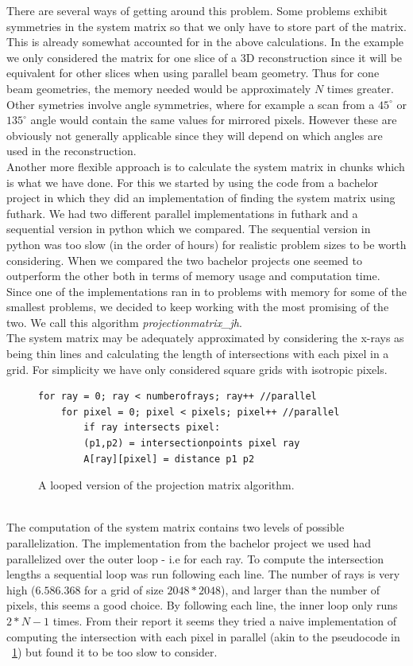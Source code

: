 There are several ways of getting around this problem. Some problems exhibit symmetries in the system matrix so that we only have to store part of the matrix. This is already somewhat accounted for in the above calculations. In the example we only considered the matrix for one slice of a 3D reconstruction since it will be equivalent for other slices when using parallel beam geometry. Thus for cone beam geometries, the memory needed would be approximately $N$ times greater. Other symetries involve angle symmetries, where for example a scan from a $45^{\circ}$ or $135^{\circ}$ angle would contain the same values for mirrored pixels. However these are obviously not generally applicable since they will depend on which angles are used in the reconstruction.\\
Another more flexible approach is to calculate the system matrix in chunks which is what we have done. For this we started by using the code from a bachelor project in which they did an implementation of finding the system matrix using futhark. We had two different parallel implementations in futhark and a sequential version in python which we compared. The sequential version in python was too slow (in the order of hours) for realistic problem sizes to be worth considering. When we compared the two bachelor projects one seemed to outperform the other both in terms of memory usage and computation time. Since one of the implementations ran in to problems with memory for some of the smallest problems, we decided to keep working with the most promising of the two. We call this algorithm \emph{projectionmatrix\_jh}.\\
The system matrix may be adequately approximated by considering the x-rays as being thin lines and calculating the length of intersections with each pixel in a grid. For simplicity we have only considered square grids with isotropic pixels.\\
\begin{figure}[!h]
\begin{lstlisting}[frame=single]
for ray = 0; ray < numberofrays; ray++ //parallel
	for pixel = 0; pixel < pixels; pixel++ //parallel
		if ray intersects pixel:
        (p1,p2) = intersectionpoints pixel ray
        A[ray][pixel] = distance p1 p2
\end{lstlisting}
\label{sysmat}
  \caption{A looped version of the projection matrix algorithm.}
\end{figure}\\
The computation of the system matrix contains two levels of possible parallelization. The implementation from the bachelor project we used had parallelized over the outer loop - i.e for each ray. To compute the intersection lengths a sequential loop was run following each line. The number of rays is very high ($6.586.368$ for a grid of size $2048*2048$), and larger than the number of pixels, this seems a good choice. By following each line, the inner loop only runs $2*N-1$ times. From their report it seems they tried a naive implementation of computing the intersection with each pixel in parallel (akin to the pseudocode in ~\ref{sysmat}) but found it to be too slow to consider.\\
